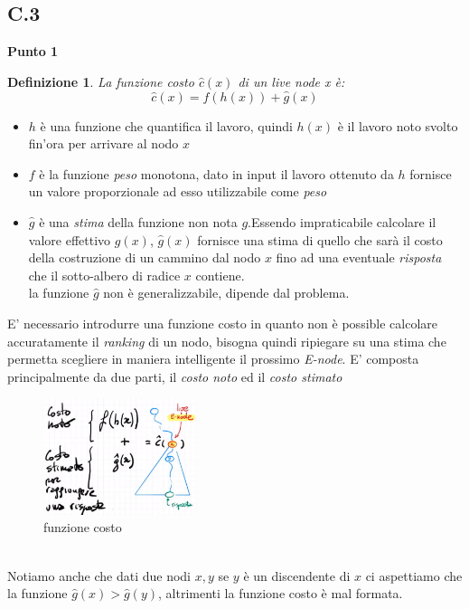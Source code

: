 \documentclass[a4paper]{article}
\newtheorem*{definition}{Definizione}
\begin{document}
\subsection{C.3}
\label{SEC:C_3}
\textbf{Punto 1}
\begin{adjustwidth}{.8cm}{0cm}
\begin{definition}
	La \textit{funzione costo} $\hat c(x)$ di un \textit{live node x} è: $$\hat c(x) = f(h(x)) + \hat g(x)$$
\end{definition}
\begin{itemize}
	\item$h$ è una funzione che quantifica il lavoro, quindi $h(x)$ è il lavoro noto svolto fin'ora per arrivare al nodo $x$
	\item$f$ è la funzione \emph{peso} monotona, dato in input il lavoro ottenuto da $h$ fornisce un valore proporzionale ad esso utilizzabile come \emph{peso}
	\item$\hat g$ è una \textit{stima} della funzione non nota $g$.Essendo impraticabile calcolare il valore effettivo $g(x)$, $\hat g(x)$ fornisce una stima di quello che sarà il costo della costruzione di un cammino dal nodo $x$ fino ad una eventuale \textit{risposta} che il sotto-albero di radice $x$ contiene.\\
		la funzione $\hat g$ non è generalizzabile, dipende dal problema.
\end{itemize}
E' necessario introdurre una funzione costo in quanto non è possible calcolare accuratamente il \textit{ranking} di un nodo, bisogna quindi ripiegare su una stima che permetta scegliere in maniera intelligente il prossimo \textit{E-node}.
E' composta principalmente da due parti, il \textit{costo noto} ed il \textit{costo stimato}\\
\begin{figure}[!ht]
\centering
\includegraphics[width=0.4\textwidth]{./img/C_3_punto1.png}
\caption{funzione costo} \label{FIG:C_3_punto1}
\end{figure}\\
Notiamo anche che dati due nodi $x,y$ se $y$ è un discendente di $x$ ci aspettiamo che la funzione $\hat g(x) > \hat g(y)$, altrimenti la funzione costo è mal formata.
\end{adjustwidth}
\end{document}
